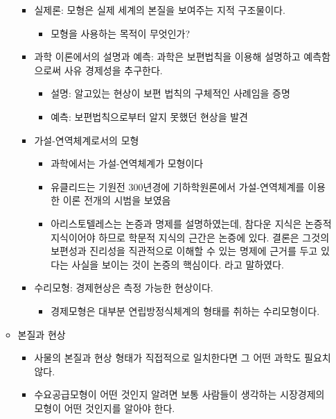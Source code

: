 \documentclass{report}
\begin{document}
\begin{itemize}
\begin{itemize}
\begin{itemize}
            \item 실제론: 모형은 실제 세계의 본질을 보여주는 지적 구조물이다.
            \begin{itemize}
                \item 모형을 사용하는 목적이 무엇인가?
            \end{itemize}
            \item 과학 이론에서의 설명과 예측: 과학은 보편법칙을 이용해 설명하고 예측함으로써 사유 경제성을 추구한다.
            \begin{itemize}
                \item 설명: 알고있는 현상이 보편 법칙의 구체적인 사례임을 증명
                \item 예측: 보편법칙으로부터 알지 못했던 현상을 발견
            \end{itemize}
            \item 가설-연역체계로서의 모형
            \begin{itemize}
                \item 과학에서는 가설-연역체계가 모형이다
                \item 유클리드는 기원전 300년경에 기하학원론에서 가설-연역체계를 이용한 이론 전개의 시범을 보였음
                \item 아리스토텔레스는 논증과 명제를 설명하였는데, 참다운 지식은 논증적 지식이어야 하므로 학문적 지식의 근간은 논증에 있다. 결론은 그것의 보편성과 진리성을 직관적으로 이해할 수 있는 명제에 근거를 두고 있다는 사실을 보이는 것이 논증의 핵심이다. 라고 말하였다.
            \end{itemize}
            \item 수리모형: 경제현상은 측정 가능한 현상이다.
            \begin{itemize}
                \item 경제모형은 대부분 연립방정식체계의 형태를 취하는 수리모형이다.
            \end{itemize}
        \end{itemize}
        \item 본질과 현상
        \begin{itemize}
            \item 사물의 본질과 현상 형태가 직접적으로 일치한다면 그 어떤 과학도 필요치 않다.
            \item 수요공급모형이 어떤 것인지 알려면 보통 사람들이 생각하는 시장경제의 모형이 어떤 것인지를 알아야 한다.
        \end{itemize}
    \end{itemize}

\end{itemize}
\end{document}
